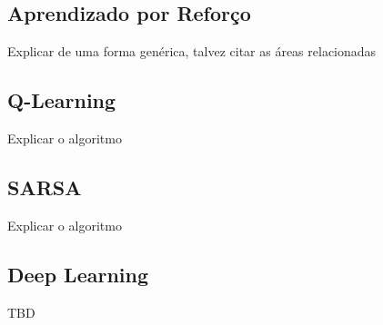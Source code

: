 \subsection{Aprendizado por Reforço}

Explicar de uma forma genérica, talvez citar as áreas relacionadas

\subsection{Q-Learning}

Explicar o algoritmo

\subsection{SARSA}

Explicar o algoritmo

\subsection{Deep Learning}

TBD
